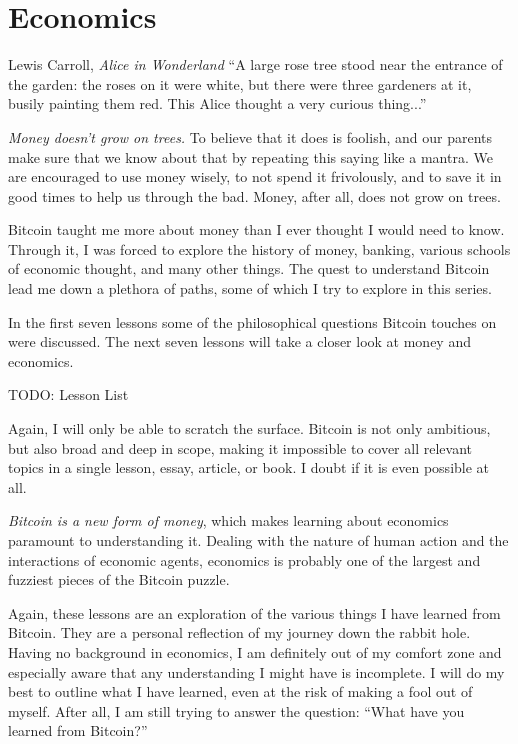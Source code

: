 
\part{Economics}
\label{ch:economics}

\begin{chapquote}{Lewis Carroll, \textit{Alice in Wonderland}}
``A large rose tree stood near the entrance of the garden: the roses on it were
white, but there were three gardeners at it, busily painting them red. This
Alice thought a very curious thing...''
\end{chapquote}

\textit{Money doesn’t grow on trees.} To believe that it does is foolish, and our
parents make sure that we know about that by repeating this saying like a
mantra. We are encouraged to use money wisely, to not spend it frivolously,
and to save it in good times to help us through the bad. Money, after all,
does not grow on trees.

Bitcoin taught me more about money than I ever thought I would need to know.
Through it, I was forced to explore the history of money, banking, various
schools of economic thought, and many other things. The quest to understand
Bitcoin lead me down a plethora of paths, some of which I try to explore in
this series.

In the first seven lessons some of the philosophical questions Bitcoin touches
on were discussed. The next seven lessons will take a closer look at money and
economics.

TODO: Lesson List

Again, I will only be able to scratch the surface. Bitcoin is not only
ambitious, but also broad and deep in scope, making it impossible to cover all
relevant topics in a single lesson, essay, article, or book. I  doubt if it is
even possible at all.

\textit{Bitcoin is a new form of money}, which makes learning about
economics paramount to understanding it. Dealing with the nature of human action
and the interactions of economic agents, economics is probably one of the
largest and fuzziest pieces of the Bitcoin puzzle.

Again, these lessons are an exploration of the various things I have learned
from Bitcoin. They are a personal reflection of my journey down the rabbit hole.
Having no background in economics, I am definitely out of my comfort zone and
especially aware that any understanding I might have is incomplete. I will do my
best to outline what I have learned, even at the risk of making a fool out of
myself. After all, I am still trying to answer the question: ``What have you
learned from Bitcoin?''

